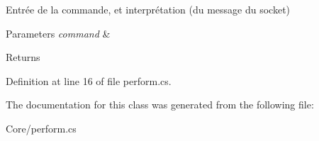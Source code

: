 Entrée de la commande, et interprétation (du message du socket) 


\begin{DoxyParams}{Parameters}
{\em command} & \\
\hline
\end{DoxyParams}
\begin{DoxyReturn}{Returns}

\end{DoxyReturn}


Definition at line 16 of file perform.\+cs.



The documentation for this class was generated from the following file\+:\begin{DoxyCompactItemize}
\item 
Core/perform.\+cs\end{DoxyCompactItemize}
